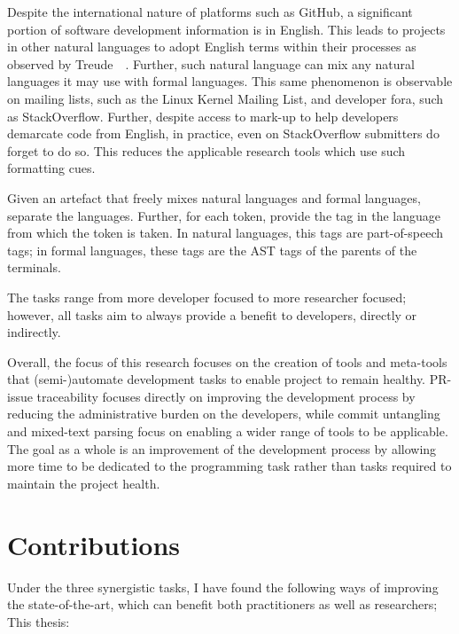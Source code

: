 Despite the international nature of platforms such as GitHub, a significant
portion of software development information is in English. This leads to
projects in other natural languages to adopt English terms within their
processes as observed by Treude~\etal~\cite{Treude2015portuguese}. Further, such
natural language can mix any natural languages it may use with formal languages.
This same phenomenon is observable on mailing lists, such as the Linux Kernel
Mailing List, and developer fora, such as StackOverflow.  Further, despite
access to mark-up to help developers demarcate code from English, in practice,
even on StackOverflow submitters do forget to do so. This reduces the applicable
research tools which use such formatting cues.

\begin{tcolorbox}[title=Mixed-text Parsing]
    Given an artefact that freely mixes natural languages and formal languages,
    separate the languages. Further, for each token, provide the tag in the
    language from which the token is taken. In natural languages, this tags are
    part-of-speech tags; in formal languages, these tags are the AST tags of the
    parents of the terminals.
\end{tcolorbox}

\noindent The tasks range from more developer focused to more researcher
focused; however, all tasks aim to always provide a benefit to developers,
directly or indirectly.

Overall, the focus of this research focuses on the creation of tools and
meta-tools that (semi-)automate development tasks to enable project to remain
healthy. PR-issue traceability focuses directly on improving the development
process by reducing the administrative burden on the developers, while commit
untangling and mixed-text parsing focus on enabling a wider range of tools to be
applicable. The goal as a whole is an improvement of the development process by
allowing more time to be dedicated to the programming task rather than tasks
required to maintain the project health.

\section{Contributions}
\label{chapter:introduction:sec:contrib}

Under the three synergistic tasks, I have found the following ways of improving
the state-of-the-art, which can benefit both practitioners as well as
researchers; This thesis:

